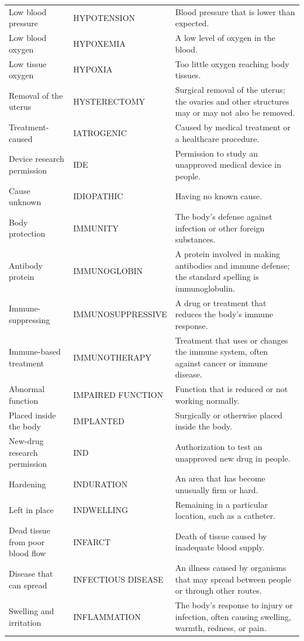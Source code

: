 \begin{longtable}{>{\raggedright\arraybackslash}p{} >{\raggedright\arraybackslash}p{} >{\raggedright\arraybackslash}p{}}
Low blood pressure & HYPOTENSION & Blood pressure that is lower than expected. \\
Low blood oxygen & HYPOXEMIA & A low level of oxygen in the blood. \\
Low tissue oxygen & HYPOXIA & Too little oxygen reaching body tissues. \\
Removal of the uterus & HYSTERECTOMY & Surgical removal of the uterus; the ovaries and other structures may or may not also be removed. \\
Treatment-caused & IATROGENIC & Caused by medical treatment or a healthcare procedure. \\
Device research permission & IDE & Permission to study an unapproved medical device in people. \\
Cause unknown & IDIOPATHIC & Having no known cause. \\
Body protection & IMMUNITY & The body's defense against infection or other foreign substances. \\
Antibody protein & IMMUNOGLOBIN & A protein involved in making antibodies and immune defense; the standard spelling is immunoglobulin. \\
Immune-suppressing & IMMUNOSUPPRESSIVE & A drug or treatment that reduces the body's immune response. \\
Immune-based treatment & IMMUNOTHERAPY & Treatment that uses or changes the immune system, often against cancer or immune disease. \\
Abnormal function & IMPAIRED FUNCTION & Function that is reduced or not working normally. \\
Placed inside the body & IMPLANTED & Surgically or otherwise placed inside the body. \\
New-drug research permission & IND & Authorization to test an unapproved new drug in people. \\
Hardening & INDURATION & An area that has become unusually firm or hard. \\
Left in place & INDWELLING & Remaining in a particular location, such as a catheter. \\
Dead tissue from poor blood flow & INFARCT & Death of tissue caused by inadequate blood supply. \\
Disease that can spread & INFECTIOUS DISEASE & An illness caused by organisms that may spread between people or through other routes. \\
Swelling and irritation & INFLAMMATION & The body's response to injury or infection, often causing swelling, warmth, redness, or pain. \\

\end{longtable}
